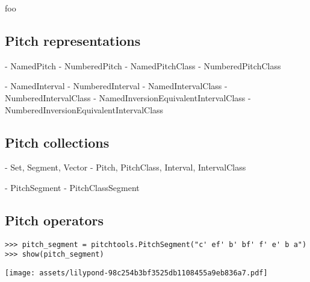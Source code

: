 foo

\subsection{Pitch representations}

\begin{markdown}
- NamedPitch
- NumberedPitch
- NamedPitchClass
- NumberedPitchClass
\end{markdown}

\begin{markdown}
- NamedInterval
- NumberedInterval
- NamedIntervalClass
- NumberedIntervalClass
- NamedInversionEquivalentIntervalClass
- NumberedInversionEquivalentIntervalClass
\end{markdown}

\subsection{Pitch collections}

\begin{markdown}
- Set, Segment, Vector
- Pitch, PitchClass, Interval, IntervalClass
\end{markdown}

\begin{markdown}
- PitchSegment
- PitchClassSegment
\end{markdown}

\subsection{Pitch operators}

\begin{comment}
<abjad>
pitch_segment = pitchtools.PitchSegment("c' ef' b' bf' f' e' b a")
show(pitch_segment)
</abjad>
\end{comment}

\begin{abjadbookoutput}
\begin{singlespacing}
\vspace{-0.5\baselineskip}
\begin{lstlisting}
>>> pitch_segment = pitchtools.PitchSegment("c' ef' b' bf' f' e' b a")
>>> show(pitch_segment)
\end{lstlisting}
\noindent\texttt{[image: assets/lilypond-98c254b3bf3525db1108455a9eb836a7.pdf]}
\end{singlespacing}
\end{abjadbookoutput}


